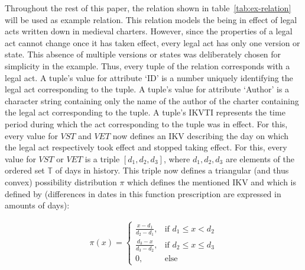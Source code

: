 \documentclass[runningheads,a4paper]{llncs}
\begin{document}
Throughout the rest of this paper, the relation shown in table~\ref{tab:ex-relation} will be used as example relation. This relation models the being in effect of legal acts written down in medieval charters. However, since the properties of a legal act cannot change once it has taken effect, every legal act has only one version or state. This absence of multiple versions or states was deliberately chosen for simplicity in the example. Thus, every tuple of the relation corresponds with a legal act. A tuple's value for attribute `ID' is a number uniquely identifying the legal act corresponding to the tuple. A tuple's value for attribute `Author' is a character string containing only the name of the author of the charter containing the legal act corresponding to the tuple. A tuple's IKVTI represents the time period during which the act corresponding to the tuple was in effect. For this, every value for $VST$ and $VET$ now defines an IKV describing the day on which the legal act respectively took effect and stopped taking effect. For this, every value for $VST$ or $VET$ is a triple $\left[d_1, d_2, d_3\right]$, where $d_1, d_2, d_3$ are elements of the ordered set $\mathbb{T}$ of days in history. This triple now defines a triangular (and thus convex) possibility distribution $\pi$ which defines the mentioned IKV and which is defined by (differences in dates in this function prescription are expressed in amounts of days):

\vspace{-10pt}
\begin{align}
\pi(x) =
\begin{cases}
\frac{x - d_1}{d_2 - d_1}, & \text{if } d_1 \leq x < d_2 \\
\frac{d_3 - x}{d_3 - d_2}, & \text{if } d_2 \leq x \leq d_3 \\
0, & \text{else}
\end{cases}
\end{align}

\vspace{-10pt}
\end{document}
